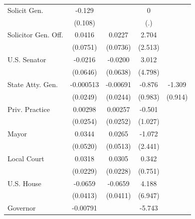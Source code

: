 {\begin{tabular}{l*{4}{c}}
\addlinespace
Solicit Gen.        &      -0.129        &                    &           0        &                    \\
                    &     (0.108)        &                    &         (.)        &                    \\
\addlinespace
Solicitor Gen. Off. &      0.0416        &      0.0227        &       2.704        &                    \\
                    &    (0.0751)        &    (0.0736)        &     (2.513)        &                    \\
\addlinespace
U.S. Senator        &     -0.0216        &     -0.0200        &       3.012        &                    \\
                    &    (0.0646)        &    (0.0638)        &     (4.798)        &                    \\
\addlinespace
State Atty. Gen.    &   -0.000513        &    -0.00691        &      -0.876        &      -1.309        \\
                    &    (0.0249)        &    (0.0244)        &     (0.983)        &     (0.914)        \\
\addlinespace
Priv. Practice      &     0.00298        &     0.00257        &      -0.501        &                    \\
                    &    (0.0254)        &    (0.0252)        &     (1.027)        &                    \\
\addlinespace
Mayor               &      0.0344        &      0.0265        &      -1.072        &                    \\
                    &    (0.0520)        &    (0.0513)        &     (2.441)        &                    \\
\addlinespace
Local Court         &      0.0318        &      0.0305        &       0.342        &                    \\
                    &    (0.0229)        &    (0.0228)        &     (0.751)        &                    \\
\addlinespace
U.S. House          &     -0.0659        &     -0.0659        &       4.188        &                    \\
                    &    (0.0413)        &    (0.0411)        &     (6.947)        &                    \\
\addlinespace
Governor            &    -0.00791        &                    &      -5.743        &                    \\

\end{tabular}}
